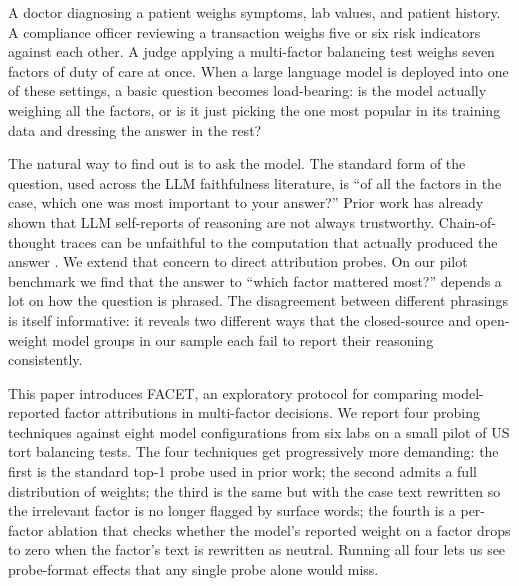 \documentclass[11pt]{article}
\begin{document}
A doctor diagnosing a patient weighs symptoms, lab values, and patient history. A compliance officer reviewing a transaction weighs five or six risk indicators against each other. A judge applying a multi-factor balancing test weighs seven factors of duty of care at once. When a large language model is deployed into one of these settings, a basic question becomes load-bearing: is the model actually weighing all the factors, or is it just picking the one most popular in its training data and dressing the answer in the rest?

The natural way to find out is to ask the model. The standard form of the question, used across the LLM faithfulness literature, is ``of all the factors in the case, which one was most important to your answer?'' Prior work has already shown that LLM self-reports of reasoning are not always trustworthy. Chain-of-thought traces can be unfaithful to the computation that actually produced the answer \citep{turpin2023,lanham2023}. We extend that concern to direct attribution probes. On our pilot benchmark we find that the answer to ``which factor mattered most?'' depends a lot on how the question is phrased. The disagreement between different phrasings is itself informative: it reveals two different ways that the closed-source and open-weight model groups in our sample each fail to report their reasoning consistently.

This paper introduces FACET, an exploratory protocol for comparing model-reported factor attributions in multi-factor decisions. We report four probing techniques against eight model configurations from six labs on a small pilot of US tort balancing tests. The four techniques get progressively more demanding: the first is the standard top-1 probe used in prior work; the second admits a full distribution of weights; the third is the same but with the case text rewritten so the irrelevant factor is no longer flagged by surface words; the fourth is a per-factor ablation that checks whether the model's reported weight on a factor drops to zero when the factor's text is rewritten as neutral. Running all four lets us see probe-format effects that any single probe alone would miss.
\end{document}
